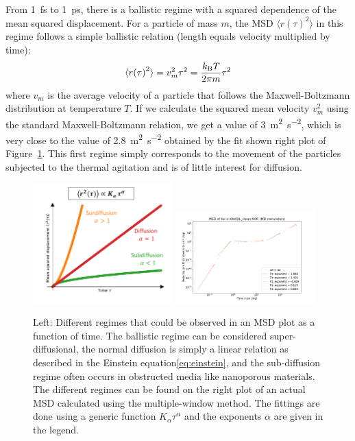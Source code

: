 \documentclass[main]{subfiles}
\begin{document}
From \SI{1}{\fs} to \SI{1}{\ps}, there is a ballistic regime with a squared dependence of the mean squared displacement. For a particle of mass $m$, the MSD $\langle {r(\tau)}^2 \rangle$ in this regime follows a simple ballistic relation (length equals velocity multiplied by time):
\begin{equation}
  \langle {r(\tau)}^2 \rangle = v_m^2 \tau^2 = \frac{k_{\text{B}}T}{2\pi m}\tau^2
\end{equation}
where $v_m$ is the average velocity of a particle that follows the Maxwell-Boltzmann distribution at temperature $T$. If we calculate the squared mean velocity $v_m^2$ using the standard Maxwell-Boltzmann relation, we get a value of \SI{3}{\square\m\per\square\second}, which is very close to the value of \SI{2.8}{\square\m\per\square\second} obtained by the fit shown right plot of Figure~\ref{fgr:MSD_init}. This first regime simply corresponds to the movement of the particles subjected to the thermal agitation and is of little interest for diffusion. 

\begin{figure}[ht]
  \centering
    \includegraphics[width=0.48\textwidth]{figures/5-diffusion/MSD_anomalous_diffusion.pdf}
    \includegraphics[width=0.48\textwidth]{figures/5-diffusion/MSD_Xe_KAXQIL_clean.pdf}
    \caption{Left: Different regimes that could be observed in an MSD plot as a function of time. The ballistic regime can be considered super-diffusional, the normal diffusion is simply a linear relation as described in the Einstein equation\ref{eq:einstein}, and the sub-diffusion regime often occurs in obstructed media like nanoporous materials. The different regimes can be found on the right plot of an actual MSD calculated using the multiple-window method. The fittings are done using a generic function $K_\alpha\tau^\alpha$ and the exponents $\alpha$ are given in the legend. }\label{fgr:MSD_init}
\end{figure}
\end{document}
